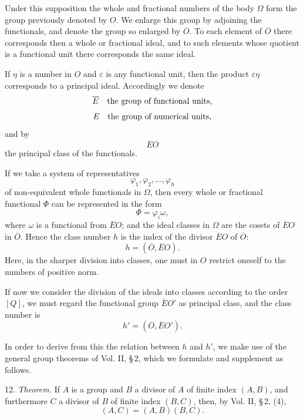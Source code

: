 \documentclass[11pt]{article}
\begin{document}
Under this supposition the whole and fractional numbers of the body \(\Omega\) form the group previously denoted by \(O\). We enlarge this group by adjoining the functionals, and denote the group so enlarged by \(\overline O\). To each element of \(\overline O\) there corresponds then a whole or fractional ideal, and to such elements whose quotient is a functional unit there corresponds the same ideal.

If \(\eta\) is a number in \(O\) and \(\varepsilon\) is any functional unit, then the product \(\varepsilon\eta\) corresponds to a principal ideal. Accordingly we denote
\[
 \overline E\quad\hbox{the group of functional units,}
\]
\[
 E\quad\hbox{the group of numerical units,}
\]
and by
\[
 \overline EO
\]
the principal class of the functionals.

If we take a system of representatives
\begin{equation}
 \varphi_1,\varphi_2,\ldots,\varphi_h
\tag{1}
\end{equation}
of non-equivalent whole functionals in \(\Omega\), then every whole or fractional functional \(\Phi\) can be represented in the form
\[
 \Phi=\varphi_i\omega,
\]
where \(\omega\) is a functional from \(\overline EO\); and the ideal classes in \(\Omega\) are the cosets of \(\overline EO\) in \(\overline O\). Hence the class number \(h\) is the index of the divisor \(\overline EO\) of \(\overline O\):
\begin{equation}
 h=(\overline O,\overline EO).
\tag{2}
\end{equation}
Here, in the sharper division into classes, one must in \(O\) restrict oneself to the numbers of positive norm.

If now we consider the division of the ideals into classes according to the order \([Q]\), we must regard the functional group \(\overline EO'\) as principal class, and the class number is
\begin{equation}
 h'=(\overline O,\overline EO').
\tag{3}
\end{equation}

In order to derive from this the relation between \(h\) and \(h'\), we make use of the general group theorems of Vol. II, \S\,2, which we formulate and supplement as follows.

12. \emph{Theorem.} If \(A\) is a group and \(B\) a divisor of \(A\) of finite index \((A,B)\), and furthermore \(C\) a divisor of \(B\) of finite index \((B,C)\), then, by Vol. II, \S\,2, (4),
\begin{equation}
 (A,C)=(A,B)(B,C).
\tag{4}
\end{equation}
\end{document}
